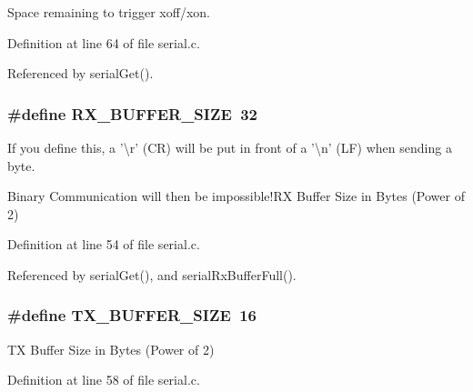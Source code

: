Space remaining to trigger xoff/xon. 



Definition at line 64 of file serial.\-c.



Referenced by serial\-Get().

\hypertarget{group__uart_ga739a2a1a0047c98ac1b18ecd25dac092}{
\subsubsection[{R\-X\-\_\-\-B\-U\-F\-F\-E\-R\-\_\-\-S\-I\-Z\-E}]{\setlength{\rightskip}{0pt plus 5cm}\#define R\-X\-\_\-\-B\-U\-F\-F\-E\-R\-\_\-\-S\-I\-Z\-E~32}}\label{group__uart_ga739a2a1a0047c98ac1b18ecd25dac092}


If you define this, a '\textbackslash{}r' (C\-R) will be put in front of a '\textbackslash{}n' (L\-F) when sending a byte. 

Binary Communication will then be impossible!\-R\-X Buffer Size in Bytes (Power of 2) 

Definition at line 54 of file serial.\-c.



Referenced by serial\-Get(), and serial\-Rx\-Buffer\-Full().

\hypertarget{group__uart_ga9ab33647617098646990fe263600b650}{
\subsubsection[{T\-X\-\_\-\-B\-U\-F\-F\-E\-R\-\_\-\-S\-I\-Z\-E}]{\setlength{\rightskip}{0pt plus 5cm}\#define T\-X\-\_\-\-B\-U\-F\-F\-E\-R\-\_\-\-S\-I\-Z\-E~16}}\label{group__uart_ga9ab33647617098646990fe263600b650}


T\-X Buffer Size in Bytes (Power of 2) 



Definition at line 58 of file serial.\-c.



